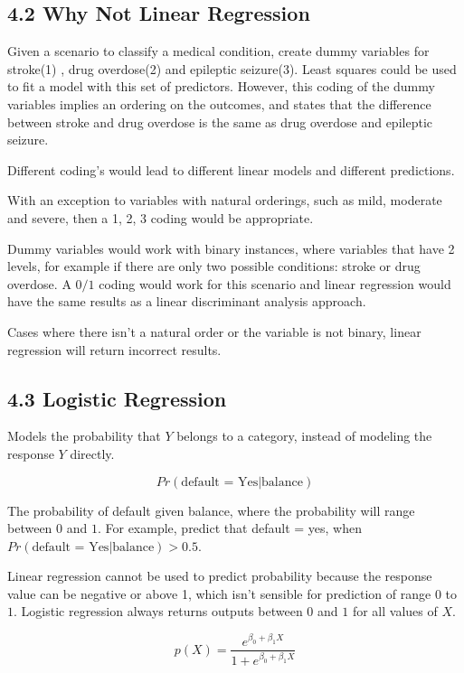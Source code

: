 \documentclass[
]{article}
\author{}
\date{}
\begin{document}
\hypertarget{header-n0}{%
\subsection{4.2 Why Not Linear Regression}\label{header-n0}}

Given a scenario to classify a medical condition, create dummy variables
for stroke(1) , drug overdose(2) and epileptic seizure(3). Least squares
could be used to fit a model with this set of predictors. However, this
coding of the dummy variables implies an ordering on the outcomes, and
states that the difference between stroke and drug overdose is the same
as drug overdose and epileptic seizure.

Different coding's would lead to different linear models and different
predictions.

With an exception to variables with natural orderings, such as mild,
moderate and severe, then a 1, 2, 3 coding would be appropriate.

Dummy variables would work with binary instances, where variables that
have 2 levels, for example if there are only two possible conditions:
stroke or drug overdose. A \(0/1\) coding would work for this scenario
and linear regression would have the same results as a linear
discriminant analysis approach.

Cases where there isn't a natural order or the variable is not binary,
linear regression will return incorrect results.

\hypertarget{header-n7}{%
\subsection{4.3 Logistic Regression}\label{header-n7}}

Models the probability that \(Y\) belongs to a category, instead of
modeling the response \(Y\) directly.

\[Pr(\text{default = Yes}|\text{balance})\]

The probability of default given balance, where the probability will
range between \(0\) and \(1\). For example, predict that default = yes,
when \(Pr(\text{default = Yes}|\text{balance}) > 0.5\).

Linear regression cannot be used to predict probability because the
response value can be negative or above 1, which isn't sensible for
prediction of range \(0\) to \(1\). Logistic regression always returns
outputs between \(0\) and \(1\) for all values of \(X\).

\[p(X) = \frac{e^{\beta_0 + \beta_1X}}{1+e^{\beta_0 + \beta_1X}}\]
\end{document}
